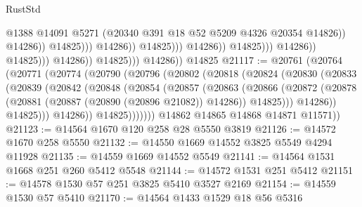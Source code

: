 \begin{lexlean}{RustStd}
\begin{coremodule}
                                                            @1388
                                                            @14091
                                                            @5271
                                                            (@20340
                                                              @391
                                                              @18
                                                              @52
                                                              @5209
                                                              @4326
                                                              @20354
                                                              @14826))
                                                          @14286))
                                                      @14825)))
                                                @14286))
                                            @14825)))
                                      @14286))
                                  @14825)))
                            @14286))
                        @14825)))
                  @14286))
              @14825)))
        @14286))
    @14825
@21117 := @20761
    (@20764
      (@20771
        (@20774
          (@20790
            (@20796
              (@20802
                (@20818
                  (@20824
                    (@20830
                      (@20833
                        (@20839
                          (@20842
                            (@20848
                              (@20854
                                (@20857
                                  (@20863
                                    (@20866
                                      (@20872
                                        (@20878
                                          (@20881 (@20887 (@20890 (@20896 @21082)) @14286))
                                          @14825)))
                                    @14286))
                                @14825)))
                          @14286))
                      @14825)))))))
        @14862
        @14865
        @14868
        @14871
        @11571))
@21123 := @14564 @1670 @120 @258 @28 @5550 @3819
@21126 := @14572 @1670 @258 @5550
@21132 := @14550 @1669 @14552 @3825 @5549 @4294 @11928
@21135 := @14559 @1669 @14552 @5549
@21141 := @14564 @1531 @1668 @251 @260 @5412 @5548
@21144 := @14572 @1531 @251 @5412
@21151 := @14578 @1530 @57 @251 @3825 @5410 @3527 @2169
@21154 := @14559 @1530 @57 @5410
@21170 := @14564
    @1433
    @1529
    @18
    @56
    @5316

\end{coremodule}
\end{lexlean}
